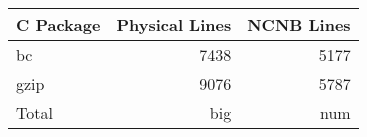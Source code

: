 \begin{tabular}{|l|r|r|}\hline
C Package & Physical Lines & NCNB Lines\\\hline\hline
bc & 7438 & 5177\\\hline
gzip & 9076 & 5787\\\hline\hline

Total & big & num\\\hline
\end{tabular}
